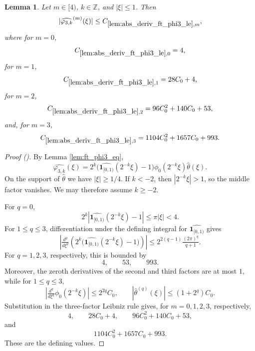 \documentclass[12pt,reqno]{amsart}
\newcommand{\auto}{{({\tiny\faCar})}}
\theoremstyle{plain}
\newtheorem{lemma}[theorem]{Lemma}
\numberwithin{equation}{section}
\theoremstyle{remark}
\newcommand{\using}[1]{}
\newcommand{\Z}{{\mathbb Z}}
\begin{document}
\begin{lemma}\label{lem:abs_deriv_ft_phi3_le}\using{lem:ft_phi3_eq}
Let $m\in[4)$, $k\in\Z$, and $|\xi|\le1$. Then
\begin{equation}\label{auto:varphi-three-Fourier-derivative-bound}
|\widehat{\varphi_{3,k}}^{(m)}(\xi)|
\le C_{\ref{lem:abs_deriv_ft_phi3_le},m},
\end{equation}
where for $m=0$,
\begin{equation}\label{auto:varphi-three-Fourier-derivative-constant}
C_{\ref{lem:abs_deriv_ft_phi3_le},0}=4,
\end{equation}
for $m=1$,
\begin{equation}\label{auto:varphi-three-Fourier-derivative-constant-one}
C_{\ref{lem:abs_deriv_ft_phi3_le},1}=28C_0+4,
\end{equation}
for $m=2$,
\begin{equation}\label{auto:varphi-three-Fourier-derivative-constant-two}
C_{\ref{lem:abs_deriv_ft_phi3_le},2}=96C_0^2+140C_0+53,
\end{equation}
and, for $m=3$,
\begin{equation}\label{auto:varphi-three-Fourier-derivative-constant-three}
C_{\ref{lem:abs_deriv_ft_phi3_le},3}=1104C_0^2+1657C_0+993.
\end{equation}
\end{lemma}
\begin{proof}[Proof \auto]
By Lemma \ref{lem:ft_phi3_eq},
\[
\widehat{\varphi_{3,k}}(\xi)
=
2^k\bigl(\widehat{\mathbf1_{[0,1)}}(2^{-k}\xi)-1\bigr)
\widehat{\phi_0}(2^{-k}\xi)\widehat\theta(\xi).
\]
On the support of $\widehat\theta$ we have $|\xi|\ge1/4$. If $k<-2$, then $|2^{-k}\xi|>1$, so the middle factor vanishes. We may therefore assume $k\ge-2$.

For $q=0$,
\[
2^k|\widehat{\mathbf1_{[0,1)}}(2^{-k}\xi)-1|
\le\pi|\xi|<4.
\]
For $1\le q\le3$, differentiation under the defining integral for $\widehat{\mathbf1_{[0,1)}}$ gives
\[
\left|\tfrac{d^q}{d\xi^q}
\left(2^k\bigl(\widehat{\mathbf1_{[0,1)}}(2^{-k}\xi)-1\bigr)\right)\right|
\le2^{2(q-1)}\tfrac{(2\pi)^q}{q+1}.
\]
For $q=1,2,3$, respectively, this is bounded by
\[
4,
\qquad
53,
\qquad
993.
\]
Moreover, the zeroth derivatives of the second and third factors are at most $1$, while for $1\le q\le3$,
\[
\left|\tfrac{d^q}{d\xi^q}\widehat{\phi_0}(2^{-k}\xi)\right|
\le2^{2q}C_0,
\qquad
|\widehat\theta^{(q)}(\xi)|\le(1+2^q)C_0.
\]
Substitution in the three-factor Leibniz rule gives, for $m=0,1,2,3$, respectively,
\[
4,
\qquad
28C_0+4,
\qquad
96C_0^2+140C_0+53,
\]
and
\[
1104C_0^2+1657C_0+993.
\]
These are the defining values.
\end{proof}
\end{document}
